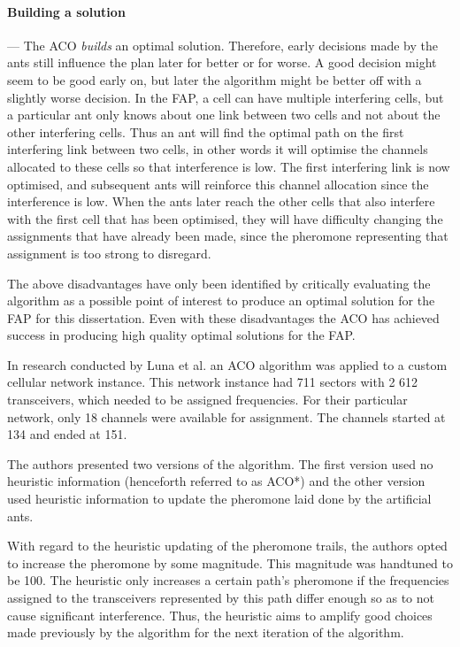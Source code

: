 \paragraph{Building a solution}
--- The ACO \emph{builds} an optimal solution. Therefore, early decisions made by the ants still influence the plan later for better or for worse. A good decision might seem to be good early on, but later the algorithm might be better off with a slightly worse decision. In the FAP, a cell can have multiple interfering cells, but a particular ant only knows about one link between two cells and not about the other interfering cells. Thus an ant will find the optimal path on the first interfering link between two cells, in other words it will optimise the channels allocated to these cells so that interference is low. The first interfering link is now optimised, and subsequent ants will reinforce this channel allocation since the interference is low. When the ants later reach the other cells that also interfere with the first cell that has been optimised, they will have difficulty changing the assignments that have already been made, since the pheromone representing that assignment is too strong to disregard.

The above disadvantages have only been identified by critically evaluating the algorithm as a possible point of interest to produce an optimal solution for the FAP for this dissertation. Even with these disadvantages the ACO has achieved success in producing high quality optimal solutions for the FAP.

In research conducted by Luna et al.\cite{ACOvsEA} an ACO algorithm was applied to a custom cellular network instance. This network instance had 711 sectors with 2 612 transceivers, which needed to be assigned frequencies. For their particular network, only 18 channels were available for assignment. The channels started at 134 and ended at 151\cite{ACOvsEA}.

The authors presented two versions of the algorithm. The first version used no heuristic information (henceforth referred to as ACO*) and the other version used heuristic information to update the pheromone laid done by the artificial ants\cite{ACOvsEA}.

With regard to the heuristic updating of the pheromone trails, the authors opted to increase the pheromone by some magnitude\cite{ACOvsEA}. This magnitude was handtuned to be 100. The heuristic only increases a certain path's pheromone if the frequencies assigned to the transceivers represented by this path differ enough so as to not cause significant interference\cite{ACOvsEA}. Thus, the heuristic aims to amplify good choices made previously by the algorithm for the next iteration of the algorithm.

